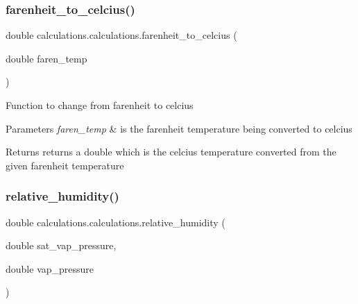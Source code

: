\subsubsection{\texorpdfstring{farenheit\+\_\+to\+\_\+celcius()}{farenheit\_to\_celcius()}}
{\footnotesize\ttfamily double calculations.\+calculations.\+farenheit\+\_\+to\+\_\+celcius (\begin{DoxyParamCaption}\item[{double}]{faren\+\_\+temp }\end{DoxyParamCaption})\hspace{0.3cm}{\ttfamily [inline]}}

Function to change from farenheit to celcius 
\begin{DoxyParams}{Parameters}
{\em faren\+\_\+temp} & is the farenheit temperature being converted to celcius \\
\hline
\end{DoxyParams}
\begin{DoxyReturn}{Returns}
returns a double which is the celcius temperature converted from the given farenheit temperature 
\end{DoxyReturn}
\mbox{\label{classcalculations_1_1calculations_a9577ccf9df8aeea64ea3fa629bc0ea71}} 
\subsubsection{\texorpdfstring{relative\+\_\+humidity()}{relative\_humidity()}}
{\footnotesize\ttfamily double calculations.\+calculations.\+relative\+\_\+humidity (\begin{DoxyParamCaption}\item[{double}]{sat\+\_\+vap\+\_\+pressure,  }\item[{double}]{vap\+\_\+pressure }\end{DoxyParamCaption})\hspace{0.3cm}{\ttfamily [inline]}}

